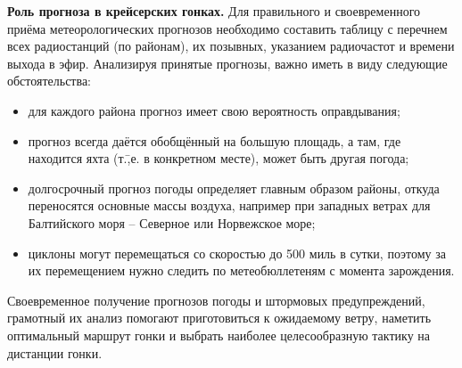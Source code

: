 \textbf{Роль прогноза в крейсерских гонках.} Для правильного и
своевременного приёма метеорологических прогнозов необходимо составить
таблицу с перечнем всех радиостанций (по районам), их позывных,
указанием радиочастот и времени выхода в эфир. Анализируя принятые
прогнозы, важно иметь в виду следующие обстоятельства:
\begin{itemize}
\item для каждого района прогноз имеет свою вероятность оправдывания;
\item прогноз всегда даётся обобщённый на большую площадь, а там, где
  находится яхта (т.\=,е. в конкретном месте), может быть другая
  погода;
\item долгосрочный прогноз погоды определяет главным образом районы,
  откуда переносятся основные массы воздуха, например при западных
  ветрах для Балтийского моря \--- Северное или Норвежское море;
\item циклоны могут перемещаться со скоростью до 500 миль в сутки,
  поэтому за их перемещением нужно следить по метеобюллетеням с
  момента зарождения.
\end{itemize}

Своевременное получение прогнозов погоды и штормовых предупреждений,
грамотный их анализ помогают приготовиться к ожидаемому ветру,
наметить оптимальный маршрут гонки и выбрать наиболее целесообразную
тактику на дистанции гонки.

\onecolumn

